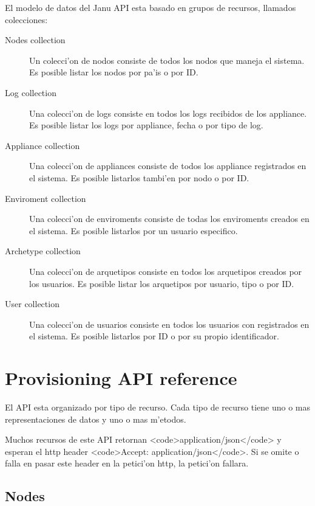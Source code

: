 El modelo de datos del Janu API esta basado en grupos de recursos, llamados colecciones:

\begin{description}
\item [Nodes collection] Un colecci'on de nodos consiste de todos los nodos que maneja el sistema. Es posible listar los nodos por pa'is o por ID.
\item [Log collection] Una colecci'on de logs consiste en todos los logs recibidos de los appliance. Es posible listar los logs por appliance, fecha o por tipo de log.
\item [Appliance collection] Una colecci'on de appliances consiste de todos los appliance registrados en el sistema. Es posible listarlos tambi'en por nodo o por ID.
\item [Enviroment collection] Una colecci'on de enviroments consiste de todas los enviroments creados en el sistema. Es posible listarlos por un usuario especifico.
\item [Archetype collection] Una colecci'on de arquetipos consiste en todos los arquetipos creados por los usuarios. Es posible listar los arquetipos por usuario, tipo o por ID.
\item [User collection] Una colecci'on de usuarios consiste en todos los usuarios con registrados en el sistema. Es posible listarlos por ID o por su propio identificador.
\end{description}

\section{Provisioning API reference}
El API esta organizado por tipo de recurso. Cada tipo de recurso tiene uno o mas representaciones de datos y uno o mas m'etodos.

Muchos recursos de este API retornan  <code>application/json</code> y esperan el http header <code>Accept: application/json</code>. Si se omite o falla en pasar este header en la petici'on http, la petici'on fallara.

\subsection{Nodes}


